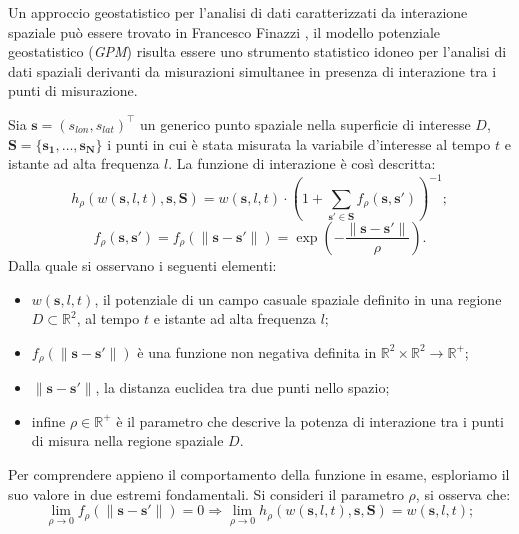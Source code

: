 \par Un approccio geostatistico per l'analisi di dati caratterizzati da interazione spaziale può essere trovato in 
Francesco Finazzi \cite{paper_GPM}, il modello potenziale geostatistico (\textit{GPM}) risulta essere uno strumento statistico idoneo per l'analisi di dati spaziali derivanti da misurazioni simultanee in presenza di interazione tra i punti di misurazione.
\par Sia $\mathbf{s} = (s_{lon}, s_{lat})^\top$ un generico punto spaziale nella superficie di interesse $D$, $\mathbf{S} = \{\mathbf{s_1}, \ldots, \mathbf{s_N}\}$ i punti in cui è stata misurata la variabile d'interesse al tempo $t$ e istante ad alta frequenza $l$. La funzione di interazione è così descritta:
\begin{equation}
	h_\rho(w(\mathbf{s}, l, t), \mathbf{s}, \mathbf{S}) = w(\mathbf{s}, l, t) \cdot \left(1 + \sum_{\mathbf{s'} \in \mathbf{S}} f_\rho(\mathbf{s}, \mathbf{s'})\right)^{-1};
	\label{funzione di interazione}
\end{equation}
\begin{equation}
	f_\rho(\mathbf{s}, \mathbf{s'}) = f_\rho(\|\mathbf{s} - \mathbf{s'}\|) = \exp\left(-\frac{{\|\mathbf{s} - \mathbf{s'}\|}}{{\rho}}\right).
	\label{nonnegative binary function}
\end{equation}
Dalla quale si osservano i seguenti elementi:
\begin{itemize}
	\item $w(\mathbf{s}, l, t)$, il potenziale di un campo casuale spaziale definito in una regione  $D \subset \mathbb{R}^2$, al tempo $t$ e istante ad alta frequenza $l$;
	\item $f_\rho(\|\mathbf{s} - \mathbf{s'}\|)$ è una funzione non negativa definita in $ \mathbb{R}^2 \times \mathbb{R}^2 \rightarrow \mathbb{R}^+$;
	\item $\|\mathbf{s} - \mathbf{s'}\|$, la distanza euclidea tra due punti nello spazio;
	\item infine $\rho \in \mathbb{R}^+$ è il parametro che descrive la potenza di interazione tra i punti di misura nella regione spaziale $D$.
\end{itemize}
Per comprendere appieno il comportamento della funzione in esame, esploriamo il suo valore in due estremi fondamentali. Si consideri il parametro $\rho$, si osserva che:
\begin{equation}
	\lim_{\rho \to 0} f_\rho(\|\mathbf{s} - \mathbf{s'}\|) = 0
		 \Rightarrow \lim_{\rho \to 0} h_\rho(w(\mathbf{s}, l, t), \mathbf{s}, \mathbf{S}) = w(\mathbf{s}, l, t) ; \label{limite_per_rho_tendente_a_0}
\end{equation}
